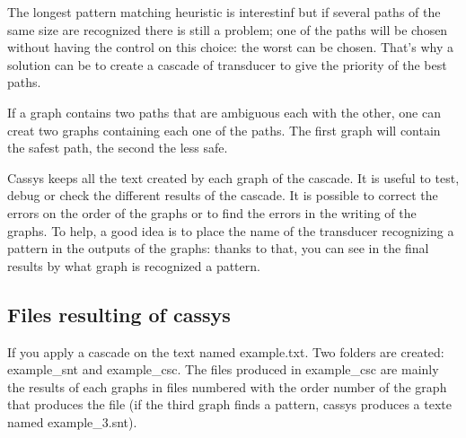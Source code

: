 \bigskip
\noindent The longest pattern matching heuristic is interestinf but if several paths of the same size are recognized there is still a problem; one of the paths will be chosen without having the control on this choice: the worst can be chosen.
That's why a solution can be to create a cascade of transducer to give the priority of the best paths.

\bigskip
\noindent If a graph contains two paths that are ambiguous each with the other, one can creat two graphs containing each one of the paths. 
The first graph will contain the safest path, the second the less safe.

\bigskip
\noindent Cassys keeps all the text created by each graph of the cascade. It is useful to test, debug or check the different results of the cascade. It is possible 
to correct the errors on the order of the graphs or to find the errors in the writing of the graphs. To help, a good idea is to place the name of the transducer recognizing a pattern in the outputs of the graphs: thanks to that, you can see in the final results by what graph is recognized a pattern. 

\subsection{Files resulting of cassys}

If you apply a cascade on the text named example.txt.
Two folders are created: example\_snt and example\_csc.
The files produced in example\_csc are mainly the results of each graphs in files numbered with the order number of the graph that produces the file (if the third graph
finds a pattern, cassys produces a texte named example\_3.snt).
